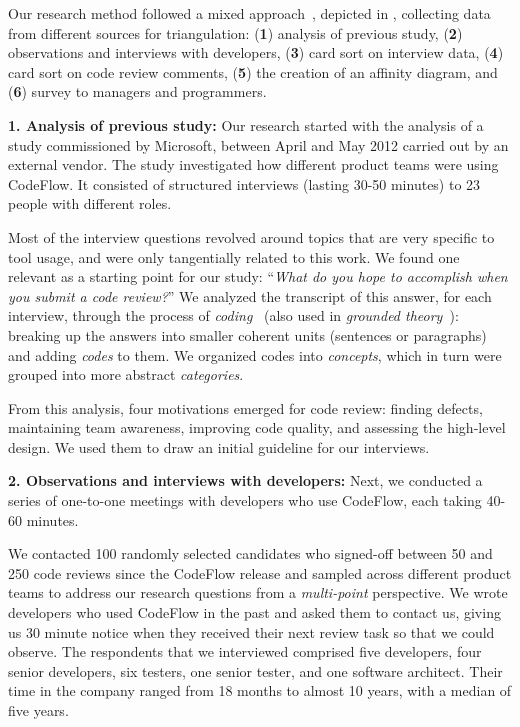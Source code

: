 Our research method followed a mixed approach~\cite{creswell2009research}, depicted in
, collecting data from different sources for triangulation: (\textbf{1})
analysis of previous study, (\textbf{2}) observations and interviews with developers,
(\textbf{3}) card sort on interview data,  (\textbf{4}) card sort on code review comments, (\textbf{5})
the creation of an affinity diagram, and (\textbf{6}) survey to managers and
programmers.

\textbf{1. Analysis of previous study:} Our research started with the analysis of a
study commissioned by Microsoft, between April and May 2012 carried out by an
external vendor. The study investigated how different product teams were using
CodeFlow. It consisted of structured interviews (lasting 30-50 minutes) to 23
people with different roles.

Most of the interview questions revolved around topics that are very specific
to tool usage, and were only tangentially related to this work. We found one
relevant as a starting point for our study: ``\emph{What do you hope to accomplish
when you submit a code review?}'' We analyzed the transcript of this answer, for
each interview, through the process of \emph{coding}~\cite{berg2004qualitative} (also used in
\emph{grounded theory}~\cite{adolph2011using}): breaking up the answers into smaller coherent
units (sentences or paragraphs) and adding \emph{codes} to them. We organized codes
into \emph{concepts}, which in turn were grouped into more abstract \emph{categories}.

From this analysis, four motivations emerged for code review: finding defects,
maintaining team awareness, improving code quality, and assessing the
high-level design. We used them to draw an initial guideline for our
interviews.

\textbf{2. Observations and interviews with developers:} Next, we conducted a series of
one-to-one meetings with developers who use CodeFlow, each taking 40-60
minutes. 

We contacted 100 randomly selected candidates who signed-off between 50 and 250 code
reviews since the CodeFlow release and sampled across different product teams
to address our research questions from a \emph{multi-point} perspective. We wrote
developers who used CodeFlow in the past and asked them to contact us, giving
us 30 minute notice when they received their next review task so that we could
observe.  The respondents that we interviewed comprised five developers, four
senior developers, six testers, one senior tester, and one software architect.
Their time in the company ranged from 18 months to almost 10 years, with a
median of five years. 

